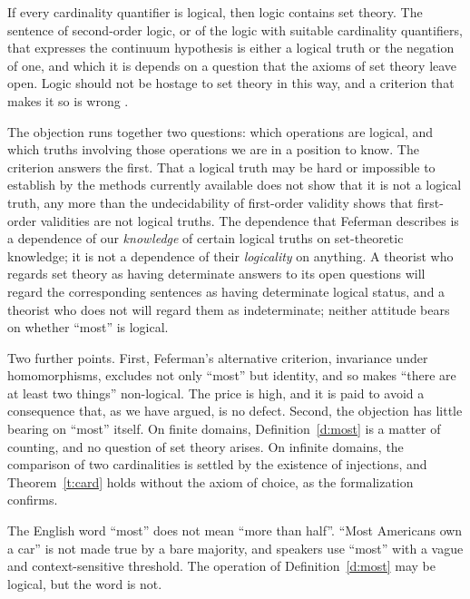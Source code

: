 \documentclass{situationist-preprint}
\begin{document}
\begin{objection}
If every cardinality quantifier is logical, then logic contains set theory. The sentence of second-order logic, or of the logic with suitable cardinality quantifiers, that expresses the continuum hypothesis is either a logical truth or the negation of one, and which it is depends on a question that the axioms of set theory leave open. Logic should not be hostage to set theory in this way, and a criterion that makes it so is wrong \citep{Feferman1999}.
\end{objection}

\begin{reply}
The objection runs together two questions: which operations are logical, and which truths involving those operations we are in a position to know. The criterion answers the first. That a logical truth may be hard or impossible to establish by the methods currently available does not show that it is not a logical truth, any more than the undecidability of first-order validity shows that first-order validities are not logical truths. The dependence that Feferman describes is a dependence of our \emph{knowledge} of certain logical truths on set-theoretic knowledge; it is not a dependence of their \emph{logicality} on anything. A theorist who regards set theory as having determinate answers to its open questions will regard the corresponding sentences as having determinate logical status, and a theorist who does not will regard them as indeterminate; neither attitude bears on whether \enquote{most} is logical.

Two further points. First, Feferman's alternative criterion, invariance under homomorphisms, excludes not only \enquote{most} but identity, and so makes \enquote{there are at least two things} non-logical. The price is high, and it is paid to avoid a consequence that, as we have argued, is no defect. Second, the objection has little bearing on \enquote{most} itself. On finite domains, Definition~\ref{d:most} is a matter of counting, and no question of set theory arises. On infinite domains, the comparison of two cardinalities is settled by the existence of injections, and Theorem~\ref{t:card} holds without the axiom of choice, as the formalization confirms.
\end{reply}

\begin{objection}
The English word \enquote{most} does not mean \enquote{more than half}. \enquote{Most Americans own a car} is not made true by a bare majority, and speakers use \enquote{most} with a vague and context-sensitive threshold. The operation of Definition~\ref{d:most} may be logical, but the word is not.
\end{objection}
\end{document}
